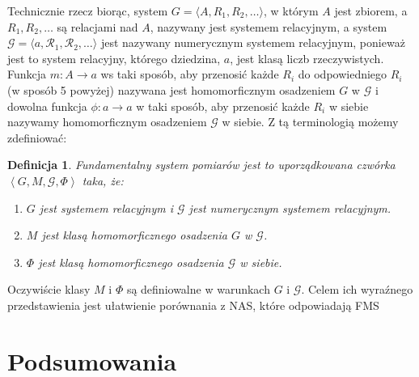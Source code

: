 \documentclass[12pt,a4paper]{report}
\newtheorem{definition}{Definicja}[chapter]
\newcommand{\tuple}[1]{\left\langle {#1} \right\rangle}
\begin{document}
Technicznie rzecz biorąc, system $G = \langle A,R_{1},R_{2},\dots \rangle$, w którym $A$ jest zbiorem, a $R_{1}, R_{2}, \dots$ są relacjami nad $A$, nazywany jest systemem relacyjnym, a system $\mathcal{G} = \langle a, \mathcal{R_{1}},\mathcal{R_{2}}, \dots \rangle$ jest nazywany numerycznym systemem relacyjnym, ponieważ jest to system relacyjny, którego dziedzina, $a$, jest klasą liczb rzeczywistych. Funkcja $m: A \to a$ ws taki sposób, aby przenosić każde $R_{i}$ do odpowiedniego $R_{i}$ (w sposób 5 powyżej) nazywana jest homomorficznym osadzeniem $G$ w $\mathcal{G}$ i dowolna funkcja $\phi :a \to a$ w taki sposób, aby przenosić każde $R_{i}$ w siebie nazywamy homomorficznym osadzeniem $\mathcal{G}$ w siebie. Z tą terminologią możemy zdefiniować:
\begin{definition}
Fundamentalny system pomiarów jest to uporządkowana czwórka $\tuple{G,M,\mathcal{G},\Phi}$ taka, że:
\begin{enumerate}
\item
$G$ jest systemem relacyjnym i $\mathcal{G}$ jest numerycznym systemem relacyjnym.
\item
$M$ jest klasą homomorficznego osadzenia $G$ w $\mathcal{G}$.
\item
$\Phi$ jest klasą homomorficznego osadzenia $\mathcal{G}$ w siebie. 
\end{enumerate} 
\end{definition}

Oczywiście klasy $M$ i $\Phi$ są definiowalne w warunkach $G$ i $\mathcal{G}$. Celem ich wyraźnego przedstawienia jest ułatwienie porównania z NAS, które odpowiadają FMS
\chapter{Podsumowania}


\end{document}
